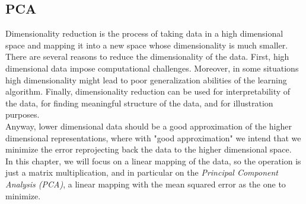 \documentclass[12pt]{report}
\theoremstyle{plain}
\begin{document}
\begin{flushleft}
\chapter{PCA}
Dimensionality reduction is the process of taking data in a high dimensional space and mapping it into a new space whose dimensionality is much smaller. There are several reasons to reduce the dimensionality of the data. First, high dimensional data impose computational challenges. Moreover, in some situations high dimensionality might lead to poor generalization abilities of the learning algorithm. Finally, dimensionality reduction can be used for interpretability of the data, for finding meaningful structure of the data, and for illustration purposes.\\
Anyway, lower dimensional data should be a good approximation of the higher dimensional representations, where with "good approximation" we intend that we minimize the error reprojecting back the data to the higher dimensional space.\\
In this chapter, we will focus on a linear mapping of the data, so the operation is just a matrix multiplication, and in particular on the \textit{Principal Component Analysis (PCA)}, a linear mapping with the mean squared error as the one to minimize.


\end{flushleft}
\end{document}
